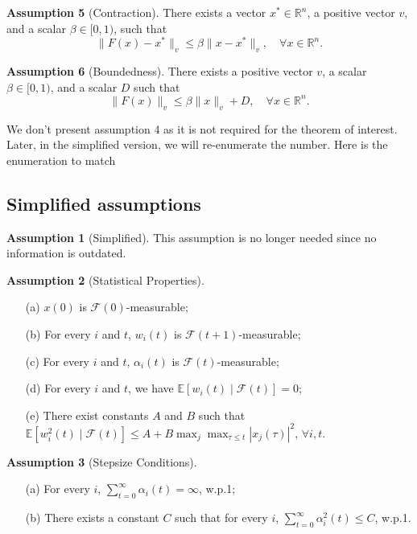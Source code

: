 \vspace{1em}

\noindent
\textbf{Assumption 5} (Contraction).
There exists a vector $x^* \in \mathbb{R}^n$, a positive vector $v$, and a scalar $\beta \in [0,1)$, such that
\begin{equation}
\|F(x) - x^*\|_v \leq \beta \|x - x^*\|_v, \quad \forall x \in \mathbb{R}^n.
\end{equation}

\vspace{1em}

\noindent
\textbf{Assumption 6} (Boundedness).
There exists a positive vector $v$, a scalar $\beta \in [0,1)$, and a scalar $D$ such that
\begin{equation}
\|F(x)\|_v \leq \beta\|x\|_v + D, \quad \forall x \in \mathbb{R}^n.
\end{equation}
\begin{remark}
    We don't present assumption 4 as it is not required for the theorem of interest. Later, in the simplified version, we will re-enumerate the number. Here is the enumeration to match \cite{tsitsiklis1994asynchronous}
\end{remark}
\subsection{Simplified assumptions}
\noindent
\textbf{Assumption 1} (Simplified).
This assumption is no longer needed since no information is outdated.
\vspace{1em}

\noindent
\textbf{Assumption 2} (Statistical Properties).
\begin{enumerate}
\item[(a)] $x(0)$ is $\mathcal{F}(0)$-measurable;
\item[(b)] For every $i$ and $t$, $w_i(t)$ is $\mathcal{F}(t+1)$-measurable;
\item[(c)] For every $i$ and $t$, $\alpha_i(t)$ is $\mathcal{F}(t)$-measurable;
\item[(d)] For every $i$ and $t$, we have $\mathbb{E}[w_i(t) \mid \mathcal{F}(t)] = 0$;
\item[(e)] There exist constants $A$ and $B$ such that
$\mathbb{E}[w_i^2(t) \mid \mathcal{F}(t)] \leq A + B \max_j \max_{\tau \leq t} |x_j(\tau)|^2$, $\forall i, t$.
\end{enumerate}

\vspace{1em}

\noindent
\textbf{Assumption 3} (Stepsize Conditions).
\begin{enumerate}
\item[(a)] For every $i$, $\sum_{t=0}^{\infty} \alpha_i(t) = \infty$, w.p.1;
\item[(b)] There exists a constant $C$ such that for every $i$, $\sum_{t=0}^{\infty} \alpha_i^2(t) \leq C$, w.p.1.
\end{enumerate}

